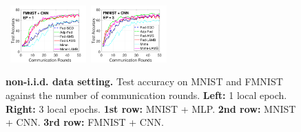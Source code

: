 \documentclass[nohyperref]{article}
\theoremstyle{plain}
\theoremstyle{definition}
\theoremstyle{remark}
\begin{document}
\begin{figure}[t]
\begin{center}
{                }
        \mbox{
        \hspace{-0.1in}\includegraphics[width=0.26\textwidth]{figure_mime/fmnist_testerror_cnn_ep1_iid0_mime.pdf}
        \hspace{-0.1in}\includegraphics[width=0.26\textwidth]{figure_mime/fmnist_testerror_cnn_ep3_iid0_mime.pdf}
        }
    \end{center}
    \vspace{0.1in}
	\caption{\textbf{non-i.i.d. data setting.} Test accuracy on MNIST and FMNIST against the number of communication rounds. \textbf{Left:} 1 local epoch. \textbf{Right:} 3 local epochs. \textbf{1st row:} MNIST + MLP. \textbf{2nd row:} MNIST + CNN. \textbf{3rd row:} FMNIST + CNN.}
	\label{fig:noniid}	\vspace{-0.1in}
\end{figure}


\begin{table}[t]
\centering
\caption{Test Accuracy with ResNet-18 Network.}\label{tab:acc}

\end{table}
\end{document}
